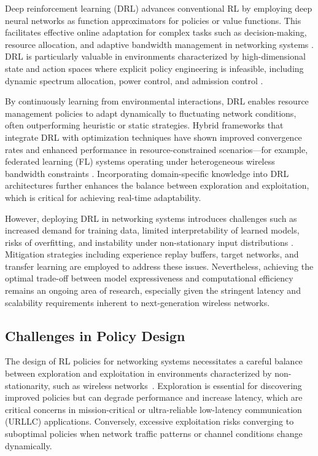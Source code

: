 \documentclass[sigconf]{acmart}
\begin{document}
Deep reinforcement learning (DRL) advances conventional RL by employing deep neural networks as function approximators for policies or value functions. This facilitates effective online adaptation for complex tasks such as decision-making, resource allocation, and adaptive bandwidth management in networking systems \cite{ref4,ref8,ref13,ref15,ref50}. DRL is particularly valuable in environments characterized by high-dimensional state and action spaces where explicit policy engineering is infeasible, including dynamic spectrum allocation, power control, and admission control \cite{ref4,ref8}.

By continuously learning from environmental interactions, DRL enables resource management policies to adapt dynamically to fluctuating network conditions, often outperforming heuristic or static strategies. Hybrid frameworks that integrate DRL with optimization techniques have shown improved convergence rates and enhanced performance in resource-constrained scenarios—for example, federated learning (FL) systems operating under heterogeneous wireless bandwidth constraints \cite{ref50}. Incorporating domain-specific knowledge into DRL architectures further enhances the balance between exploration and exploitation, which is critical for achieving real-time adaptability.

However, deploying DRL in networking systems introduces challenges such as increased demand for training data, limited interpretability of learned models, risks of overfitting, and instability under non-stationary input distributions \cite{ref13}. Mitigation strategies including experience replay buffers, target networks, and transfer learning are employed to address these issues. Nevertheless, achieving the optimal trade-off between model expressiveness and computational efficiency remains an ongoing area of research, especially given the stringent latency and scalability requirements inherent to next-generation wireless networks.

\subsection{Challenges in Policy Design}

The design of RL policies for networking systems necessitates a careful balance between exploration and exploitation in environments characterized by non-stationarity, such as wireless networks~\cite{ref3,ref6,ref14,ref48}. Exploration is essential for discovering improved policies but can degrade performance and increase latency, which are critical concerns in mission-critical or ultra-reliable low-latency communication (URLLC) applications. Conversely, excessive exploitation risks converging to suboptimal policies when network traffic patterns or channel conditions change dynamically.
\end{document}
